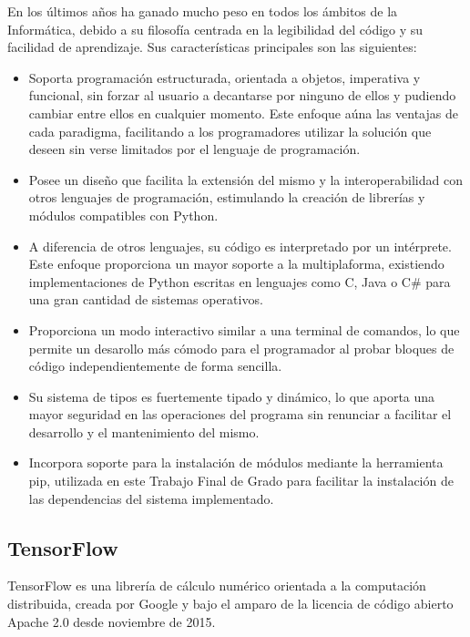 \documentclass[../main.tex]{subfiles}
\begin{document}
En los últimos años ha ganado mucho peso en todos los ámbitos de la Informática, debido a su filosofía centrada en la legibilidad del código y su facilidad de aprendizaje. Sus características principales son las siguientes:
\begin{itemize}
  \item Soporta programación estructurada, orientada a objetos, imperativa y funcional, sin forzar al usuario a decantarse por ninguno de ellos y pudiendo cambiar entre ellos en cualquier momento. Este enfoque aúna las ventajas de cada paradigma, facilitando a los programadores utilizar la solución que deseen sin verse limitados por el lenguaje de programación.
  \item Posee un diseño que facilita la extensión del mismo y la interoperabilidad con otros lenguajes de programación, estimulando la creación de librerías y módulos compatibles con Python.
  \item A diferencia de otros lenguajes, su código es interpretado por un intérprete. Este enfoque proporciona un mayor soporte a la multiplaforma, existiendo implementaciones de Python escritas en lenguajes como C, Java o C\# para una gran cantidad de sistemas operativos.
  \item Proporciona un modo interactivo similar a una terminal de comandos, lo que permite un desarollo más cómodo para el programador al probar bloques de código independientemente de forma sencilla.
  \item Su sistema de tipos es fuertemente tipado y dinámico, lo que aporta una mayor seguridad en las operaciones del programa sin renunciar a facilitar el desarrollo y el mantenimiento del mismo.
  \item Incorpora soporte para la instalación de módulos mediante la herramienta pip, utilizada en este Trabajo Final de Grado para facilitar la instalación de las dependencias del sistema implementado.
\end{itemize}

\subsection{TensorFlow}
TensorFlow es una librería de cálculo numérico orientada a la computación distribuida, creada por Google y bajo el amparo de la licencia de código abierto Apache 2.0 desde noviembre de 2015.\newline 
\end{document}
